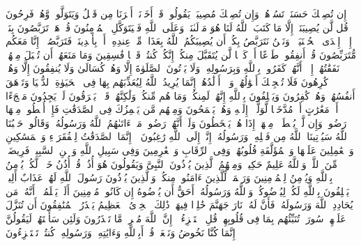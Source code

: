 إِن تُصِبۡكَ حَسَنَةࣱ تَسُؤۡهُمۡۖ وَإِن تُصِبۡكَ مُصِیبَةࣱ یَقُولُوا۟ قَدۡ أَخَذۡنَاۤ أَمۡرَنَا مِن قَبۡلُ وَیَتَوَلَّوا۟ وَّهُمۡ فَرِحُونَ%
\stopbuffer%
\startbuffer[\q:9:51]
قُل لَّن یُصِیبَنَاۤ إِلَّا مَا كَتَبَ ٱللَّهُ لَنَا هُوَ مَوۡلَىٰنَاۚ وَعَلَى ٱللَّهِ فَلۡیَتَوَكَّلِ ٱلۡمُؤۡمِنُونَ%
\stopbuffer%
\startbuffer[\q:9:52]
قُلۡ هَلۡ تَرَبَّصُونَ بِنَاۤ إِلَّاۤ إِحۡدَى ٱلۡحُسۡنَیَیۡنِۖ وَنَحۡنُ نَتَرَبَّصُ بِكُمۡ أَن یُصِیبَكُمُ ٱللَّهُ بِعَذَابࣲ مِّنۡ عِندِهِۦۤ أَوۡ بِأَیۡدِینَاۖ فَتَرَبَّصُوۤا۟ إِنَّا مَعَكُم مُّتَرَبِّصُونَ%
\stopbuffer%
\startbuffer[\q:9:53]
قُلۡ أَنفِقُوا۟ طَوۡعًا أَوۡ كَرۡهࣰا لَّن یُتَقَبَّلَ مِنكُمۡ إِنَّكُمۡ كُنتُمۡ قَوۡمࣰا فَٰسِقِینَ%
\stopbuffer%
\startbuffer[\q:9:54]
وَمَا مَنَعَهُمۡ أَن تُقۡبَلَ مِنۡهُمۡ نَفَقَٰتُهُمۡ إِلَّاۤ أَنَّهُمۡ كَفَرُوا۟ بِٱللَّهِ وَبِرَسُولِهِۦ وَلَا یَأۡتُونَ ٱلصَّلَوٰةَ إِلَّا وَهُمۡ كُسَالَىٰ وَلَا یُنفِقُونَ إِلَّا وَهُمۡ كَٰرِهُونَ%
\stopbuffer%
\startbuffer[\q:9:55]
فَلَا تُعۡجِبۡكَ أَمۡوَٰلُهُمۡ وَلَاۤ أَوۡلَٰدُهُمۡۚ إِنَّمَا یُرِیدُ ٱللَّهُ لِیُعَذِّبَهُم بِهَا فِی ٱلۡحَیَوٰةِ ٱلدُّنۡیَا وَتَزۡهَقَ أَنفُسُهُمۡ وَهُمۡ كَٰفِرُونَ%
\stopbuffer%
\startbuffer[\q:9:56]
وَیَحۡلِفُونَ بِٱللَّهِ إِنَّهُمۡ لَمِنكُمۡ وَمَا هُم مِّنكُمۡ وَلَٰكِنَّهُمۡ قَوۡمࣱ یَفۡرَقُونَ%
\stopbuffer%
\startbuffer[\q:9:57]
لَوۡ یَجِدُونَ مَلۡجَءًا أَوۡ مَغَٰرَٰتٍ أَوۡ مُدَّخَلࣰا لَّوَلَّوۡا۟ إِلَیۡهِ وَهُمۡ یَجۡمَحُونَ%
\stopbuffer%
\startbuffer[\q:9:58]
وَمِنۡهُم مَّن یَلۡمِزُكَ فِی ٱلصَّدَقَٰتِ فَإِنۡ أُعۡطُوا۟ مِنۡهَا رَضُوا۟ وَإِن لَّمۡ یُعۡطَوۡا۟ مِنۡهَاۤ إِذَا هُمۡ یَسۡخَطُونَ%
\stopbuffer%
\startbuffer[\q:9:59]
وَلَوۡ أَنَّهُمۡ رَضُوا۟ مَاۤ ءَاتَىٰهُمُ ٱللَّهُ وَرَسُولُهُۥ وَقَالُوا۟ حَسۡبُنَا ٱللَّهُ سَیُؤۡتِینَا ٱللَّهُ مِن فَضۡلِهِۦ وَرَسُولُهُۥۤ إِنَّاۤ إِلَى ٱللَّهِ رَٰغِبُونَ%
\stopbuffer%
\startbuffer[\q:9:60]
۞ إِنَّمَا ٱلصَّدَقَٰتُ لِلۡفُقَرَاۤءِ وَٱلۡمَسَٰكِینِ وَٱلۡعَٰمِلِینَ عَلَیۡهَا وَٱلۡمُؤَلَّفَةِ قُلُوبُهُمۡ وَفِی ٱلرِّقَابِ وَٱلۡغَٰرِمِینَ وَفِی سَبِیلِ ٱللَّهِ وَٱبۡنِ ٱلسَّبِیلِۖ فَرِیضَةࣰ مِّنَ ٱللَّهِۗ وَٱللَّهُ عَلِیمٌ حَكِیمࣱ%
\stopbuffer%
\startbuffer[\q:9:61]
وَمِنۡهُمُ ٱلَّذِینَ یُؤۡذُونَ ٱلنَّبِیَّ وَیَقُولُونَ هُوَ أُذُنࣱۚ قُلۡ أُذُنُ خَیۡرࣲ لَّكُمۡ یُؤۡمِنُ بِٱللَّهِ وَیُؤۡمِنُ لِلۡمُؤۡمِنِینَ وَرَحۡمَةࣱ لِّلَّذِینَ ءَامَنُوا۟ مِنكُمۡۚ وَٱلَّذِینَ یُؤۡذُونَ رَسُولَ ٱللَّهِ لَهُمۡ عَذَابٌ أَلِیمࣱ%
\stopbuffer%
\startbuffer[\q:9:62]
یَحۡلِفُونَ بِٱللَّهِ لَكُمۡ لِیُرۡضُوكُمۡ وَٱللَّهُ وَرَسُولُهُۥۤ أَحَقُّ أَن یُرۡضُوهُ إِن كَانُوا۟ مُؤۡمِنِینَ%
\stopbuffer%
\startbuffer[\q:9:63]
أَلَمۡ یَعۡلَمُوۤا۟ أَنَّهُۥ مَن یُحَادِدِ ٱللَّهَ وَرَسُولَهُۥ فَأَنَّ لَهُۥ نَارَ جَهَنَّمَ خَٰلِدࣰا فِیهَاۚ ذَٰلِكَ ٱلۡخِزۡیُ ٱلۡعَظِیمُ%
\stopbuffer%
\startbuffer[\q:9:64]
یَحۡذَرُ ٱلۡمُنَٰفِقُونَ أَن تُنَزَّلَ عَلَیۡهِمۡ سُورَةࣱ تُنَبِّئُهُم بِمَا فِی قُلُوبِهِمۡۚ قُلِ ٱسۡتَهۡزِءُوۤا۟ إِنَّ ٱللَّهَ مُخۡرِجࣱ مَّا تَحۡذَرُونَ%
\stopbuffer%
\startbuffer[\q:9:65]
وَلَئِن سَأَلۡتَهُمۡ لَیَقُولُنَّ إِنَّمَا كُنَّا نَخُوضُ وَنَلۡعَبُۚ قُلۡ أَبِٱللَّهِ وَءَایَٰتِهِۦ وَرَسُولِهِۦ كُنتُمۡ تَسۡتَهۡزِءُونَ%
\stopbuffer%
